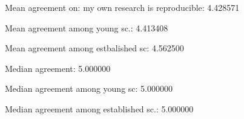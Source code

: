 
Mean agreement on: my own research is reproducible: 4.428571

Mean agreement among young sc.: 4.413408

Mean agreement among estbalished sc: 4.562500

Median agreement: 5.000000

Median agreement among young sc: 5.000000

Median agreement among established sc.: 5.000000
